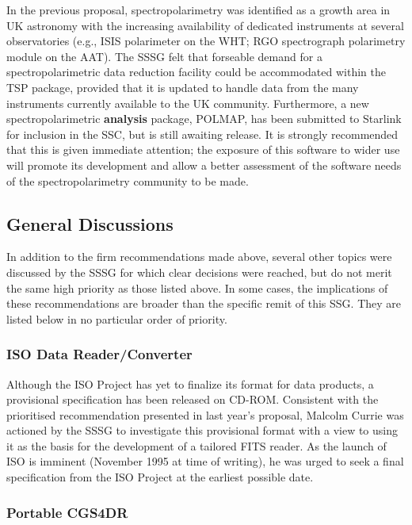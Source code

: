 In the previous proposal, spectropolarimetry was identified as a
growth area in UK astronomy with the increasing availability of
dedicated instruments at several observatories (e.g., ISIS polarimeter
on the WHT; RGO spectrograph polarimetry module on the AAT).  The SSSG
felt that forseable demand for a spectropolarimetric data reduction
facility could be accommodated within the TSP package, provided that
it is updated to handle data from the many instruments currently
available to the UK community.  Furthermore, a new spectropolarimetric
{\bf analysis} package, POLMAP, has been submitted to Starlink for
inclusion in the SSC, but is still awaiting release.  It is strongly
recommended that this is given immediate attention; the exposure of
this software to wider use will promote its development and allow a
better assessment of the software needs of the spectropolarimetry
community to be made.

\subsection{General Discussions}

In addition to the firm recommendations made above, several other
topics were discussed by the SSSG for which clear decisions were
reached, but do not merit the same high priority as those listed
above.  In some cases, the implications of these recommendations are
broader than the specific remit of this SSG.  They are listed below in
no particular order of priority.

\subsubsection{ISO Data Reader/Converter}

Although the ISO Project has yet to finalize its format for data
products, a provisional specification has been released on CD-ROM.
Consistent with the prioritised recommendation presented in last
year's proposal, Malcolm Currie was actioned by the SSSG to
investigate this provisional format with a view to using it as the
basis for the development of a tailored FITS reader.  As the launch of
ISO is imminent (November 1995 at time of writing), he was urged to
seek a final specification from the ISO Project at the earliest
possible date.

\subsubsection{\label{specSSG:CGS4DR}Portable CGS4DR}

